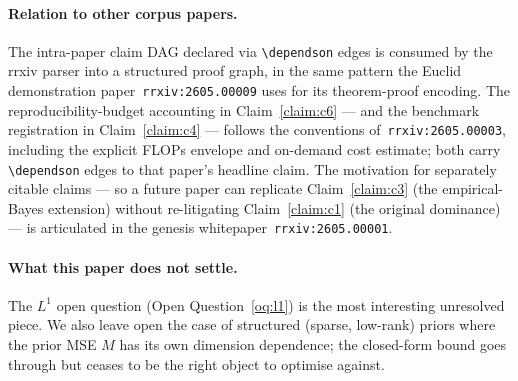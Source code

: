 \documentclass{rrxiv}
\begin{document}
\paragraph{Relation to other corpus papers.} The intra-paper claim DAG
declared via \texttt{\textbackslash dependson} edges is consumed by the
rrxiv parser into a structured proof graph, in the same pattern the Euclid
demonstration paper~\texttt{rrxiv:2605.00009} uses for its theorem-proof
encoding. The reproducibility-budget accounting in Claim~\ref{claim:c6}
--- and the benchmark registration in Claim~\ref{claim:c4} ---
follows the conventions of~\texttt{rrxiv:2605.00003}, including the
explicit FLOPs envelope and on-demand cost estimate; both carry
\texttt{\textbackslash dependson} edges to that paper's headline claim.
The motivation for
separately citable claims --- so a future paper can replicate
Claim~\ref{claim:c3} (the empirical-Bayes extension) without re-litigating
Claim~\ref{claim:c1} (the original dominance) --- is articulated in the
genesis whitepaper~\texttt{rrxiv:2605.00001}.

\paragraph{What this paper does not settle.} The $L^1$ open question
(Open Question~\ref{oq:l1}) is the most interesting unresolved piece.
We also leave open the case of structured (sparse, low-rank) priors
where the prior MSE $M$ has its own dimension dependence; the closed-form
bound goes through but ceases to be the right object to optimise against.
\end{document}
